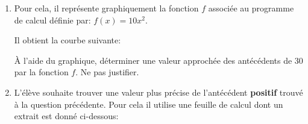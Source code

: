 \documentclass[11pt]{article}
\begin{document}
\begin{enumerate}[resume]
\item Pour cela, il représente graphiquement la fonction $f$ associée au programme de calcul définie par: $f(x)=10x^2$.

Il obtient la courbe suivante:


\begin{center}
\end{center}


À l'aide du graphique, déterminer une valeur approchée des antécédents de 30 par la fonction $f$. Ne pas justifier.

\item L'élève souhaite trouver une valeur plus précise de l'antécédent \textbf{positif} trouvé à la question précédente. Pour cela il utilise une feuille de calcul dont un extrait est donné ci-dessous:

\begin{center}


\end{center}
\end{enumerate}
\end{document}
